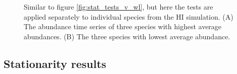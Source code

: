 \begin{figure}[hp]
	\centering
     \caption{Similar to figure \ref{fig:stat_tests_v_wl}, but here the tests are applied separately to individual species from the HI simulation. (A) The abundance time series of three species with highest average abundances. (B) The three species with lowest average abundance.} 
     \label{fig:sp_stat_tests_v_wl}   
\end{figure}

\newpage
\subsection{Stationarity results}
\label{sec:ensemble}

